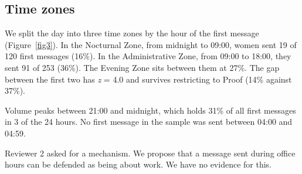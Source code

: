 \documentclass[10pt,letterpaper]{article}
\begin{document}
\subsection{Time zones}
We split the day into three time zones by the hour of the first message (Figure~\ref{fig3}). In the Nocturnal Zone, from midnight to 09:00, women sent 19 of 120 first messages (16\%). In the Administrative Zone, from 09:00 to 18:00, they sent 91 of 253 (36\%). The Evening Zone sits between them at 27\%. The gap between the first two has \emph{z} = 4.0 and survives restricting to Proof (14\% against 37\%).

Volume peaks between 21:00 and midnight, which holds 31\% of all first messages in 3 of the 24 hours. No first message in the sample was sent between 04:00 and 04:59.

Reviewer 2 asked for a mechanism. We propose that a message sent during office hours can be defended as being about work. We have no evidence for this.
\end{document}
